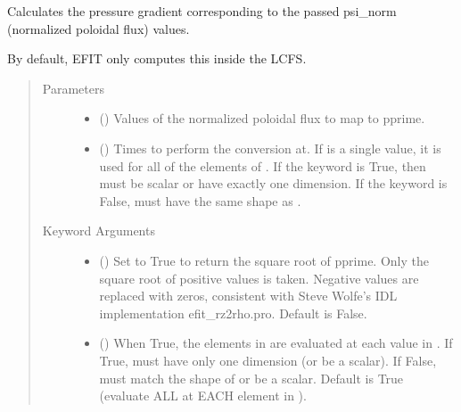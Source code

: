 \documentclass[letterpaper,10pt,english]{sphinxmanual}
\begin{document}
\begin{fulllineitems}
\begin{fulllineitems}
\label{\detokenize{eqtools:eqtools.core.Equilibrium.psinorm2pprime}}
Calculates the pressure gradient corresponding to the passed psi\_norm (normalized poloidal flux) values.

By default, EFIT only computes this inside the LCFS.
\begin{quote}\begin{description}
\item[{Parameters}] \leavevmode\begin{itemize}
\item {} 
 () \textendash{} Values of the normalized
poloidal flux to map to pprime.

\item {} 
 () \textendash{} Times to perform the conversion at.
If  is a single value, it is used for all of the elements of
. If the  keyword is True, then  must be scalar
or have exactly one dimension. If the  keyword is False,
 must have the same shape as .

\end{itemize}

\item[{Keyword Arguments}] \leavevmode\begin{itemize}
\item {} 
 () \textendash{} Set to True to return the square root of pprime. Only
the square root of positive values is taken. Negative values are
replaced with zeros, consistent with Steve Wolfe’s IDL
implementation efit\_rz2rho.pro. Default is False.

\item {} 
 () \textendash{} When True, the elements in  are evaluated at
each value in . If True,  must have only one dimension (or
be a scalar). If False,  must match the shape of  or be
a scalar. Default is True (evaluate ALL  at EACH element in
).


\end{itemize}
\end{description}
\end{quote}
\end{fulllineitems}
\end{fulllineitems}
\end{document}

